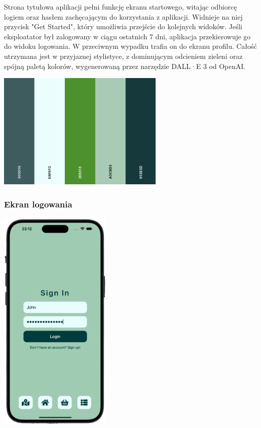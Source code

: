 Strona tytułowa aplikacji pełni funkcję ekranu startowego, witając odbiorcę logiem oraz hasłem zachęcającym do korzystania z aplikacji. Widnieje na niej przycisk "Get Started", który umożliwia przejście do kolejnych widoków. Jeśli eksploatator był zalogowany w ciągu ostatnich 7 dni, aplikacja przekierowuje go do widoku logowania. W przeciwnym wypadku trafia on do ekranu profilu. Całość utrzymana jest w przyjaznej stylistyce, z dominującym odcieniem zieleni oraz spójną paletą kolorów, wygenerowaną przez narzędzie DALL·E 3 od OpenAI.

\begin{center} \includegraphics[width=0.6\textwidth]{images/front/theme.png} \end{center}

\subsubsection{Ekran logowania}

\begin{center} \includegraphics[width=0.4\textwidth]{images/front/login_page.png} \end{center}

